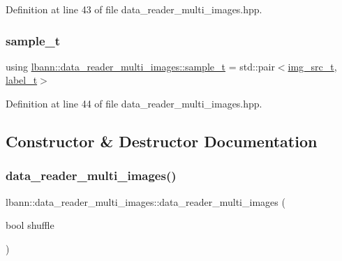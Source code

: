 Definition at line 43 of file data\+\_\+reader\+\_\+multi\+\_\+images.\+hpp.

\mbox{\label{classlbann_1_1data__reader__multi__images_a6cbb30001dd633b0d810c417cbbf441e}} 
\subsubsection{\texorpdfstring{sample\+\_\+t}{sample\_t}}
{\footnotesize\ttfamily using \hyperlink{classlbann_1_1data__reader__multi__images_a6cbb30001dd633b0d810c417cbbf441e}{lbann\+::data\+\_\+reader\+\_\+multi\+\_\+images\+::sample\+\_\+t} =  std\+::pair$<$\hyperlink{classlbann_1_1image__data__reader_acd2b41459e901a3aed39fd3be7270fa2}{img\+\_\+src\+\_\+t}, \hyperlink{classlbann_1_1image__data__reader_a7645f17852c990e80b1530509ff5e87c}{label\+\_\+t}$>$}



Definition at line 44 of file data\+\_\+reader\+\_\+multi\+\_\+images.\+hpp.



\subsection{Constructor \& Destructor Documentation}
\mbox{\label{classlbann_1_1data__reader__multi__images_a91725ae909007b26410837257aa921dc}} 
\subsubsection{\texorpdfstring{data\+\_\+reader\+\_\+multi\+\_\+images()}{data\_reader\_multi\_images()}\hspace{0.1cm}{\footnotesize\ttfamily [1/3]}}
{\footnotesize\ttfamily lbann\+::data\+\_\+reader\+\_\+multi\+\_\+images\+::data\+\_\+reader\+\_\+multi\+\_\+images (\begin{DoxyParamCaption}\item[{bool}]{shuffle }\end{DoxyParamCaption})\hspace{0.3cm}{\ttfamily [delete]}}

